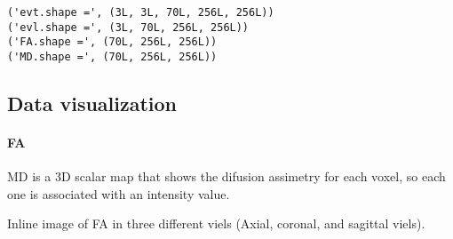\documentclass[
	12pt,				%
	openright,			%
 twoside,			%
	letterpaper,		%
	english,			%
	brazil,				%
	sumario=tradicional,
	]{abntex2}
\begin{document}
    \begin{Verbatim}[commandchars=\\\{\}]
('evt.shape =', (3L, 3L, 70L, 256L, 256L))
('evl.shape =', (3L, 70L, 256L, 256L))
('FA.shape =', (70L, 256L, 256L))
('MD.shape =', (70L, 256L, 256L))
    \end{Verbatim}

    \subsection{Data visualization}\label{data-visualization}

\paragraph{FA}\label{fa}

MD is a 3D scalar map that shows the difusion assimetry for each voxel,
so each one is associated with an intensity value.

Inline image of FA in three different viels (Axial, coronal, and
sagittal viels).
\end{document}
